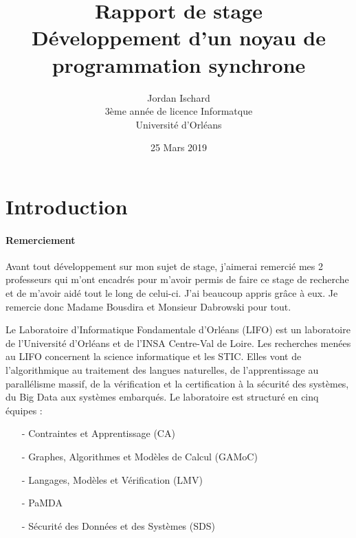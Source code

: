 \documentclass[10pt,a4paper]{article}
\begin{document}
		
	\title{\textbf{Rapport de stage \\ Développement d'un noyau de programmation synchrone}}
	\date{25 Mars 2019}
	\author{Jordan Ischard\\3ème année de licence Informatque \\ Université d'Orléans}
	\maketitle
	\newpage
	
	
	\tableofcontents
	\newpage
	
	
	
	\section{Introduction}

		\paragraph{Remerciement}
		Avant tout développement sur mon sujet de stage, j'aimerai remercié mes 2 professeurs qui m'ont encadrés pour m'avoir permis de faire ce stage de recherche et de m'avoir aidé tout le long de celui-ci. J'ai beaucoup appris grâce à eux. Je remercie donc Madame Bousdira et Monsieur Dabrowski pour tout.
		\bigbreak
		
		
		Le Laboratoire d'Informatique Fondamentale d'Orléans (LIFO) est un laboratoire de l'Université d'Orléans et de l'INSA Centre-Val de Loire. 
		\smallbreak
		Les recherches menées au LIFO concernent la science informatique et les STIC. Elles vont de l'algorithmique au traitement des langues naturelles, de l'apprentissage au parallélisme massif, de la vérification et la certification à la sécurité des systèmes, du Big Data aux systèmes embarqués. Le laboratoire est structuré en cinq équipes :
		\begin{enumerate}
			\item[-] Contraintes et Apprentissage (CA)
		    \item[-] Graphes, Algorithmes et Modèles de Calcul (GAMoC)
		    \item[-] Langages, Modèles et Vérification (LMV)
		    \item[-] PaMDA                                                   %
			\item[-]  Sécurité des Données et des Systèmes (SDS)
		\end{enumerate}
		\medbreak
		
\end{document}
